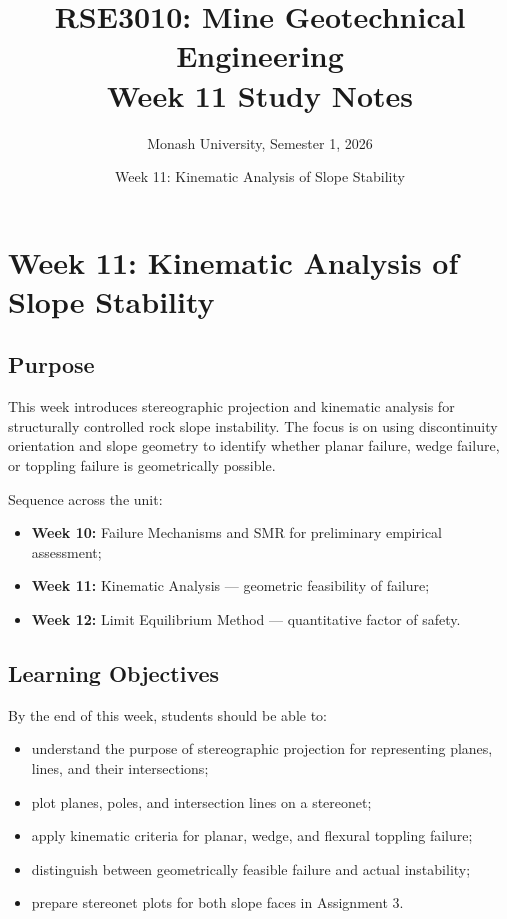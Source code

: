 \documentclass[a4paper,12pt]{article}
\title{\textbf{RSE3010: Mine Geotechnical Engineering} \\ Week 11 Study Notes}
\author{Monash University, Semester 1, 2026}
\date{Week 11: Kinematic Analysis of Slope Stability}
\begin{document}
\maketitle

\section{Week 11: Kinematic Analysis of Slope Stability}

\subsection{Purpose}

This week introduces stereographic projection and kinematic analysis for structurally controlled rock slope instability. The focus is on using discontinuity orientation and slope geometry to identify whether planar failure, wedge failure, or toppling failure is geometrically possible.

Sequence across the unit:
\begin{itemize}
    \item \textbf{Week 10:} Failure Mechanisms and SMR for preliminary empirical assessment;
    \item \textbf{Week 11:} Kinematic Analysis --- geometric feasibility of failure;
    \item \textbf{Week 12:} Limit Equilibrium Method --- quantitative factor of safety.
\end{itemize}

\subsection{Learning Objectives}

By the end of this week, students should be able to:
\begin{itemize}
    \item understand the purpose of stereographic projection for representing planes, lines, and their intersections;
    \item plot planes, poles, and intersection lines on a stereonet;
    \item apply kinematic criteria for planar, wedge, and flexural toppling failure;
    \item distinguish between geometrically feasible failure and actual instability;
    \item prepare stereonet plots for both slope faces in Assignment 3.
\end{itemize}
\end{document}
